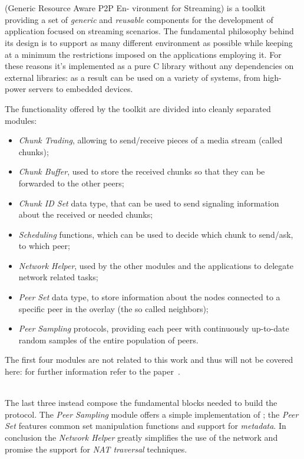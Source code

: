 \chapter{\grapes}
\grapes (Generic Resource Aware P2P En- vironment for Streaming) is a
toolkit providing a set of \textit{generic} and \textit{reusable}
components for the development of \ptop application focused on
streaming scenarios. The fundamental philosophy behind its design is
to support as many different environment as possible while keeping at
a minimum the restrictions imposed on the applications employing it.
For these reasons it's implemented as a pure C library without any dependencies
on external libraries: as a result \grapes can be used on a variety
of systems, from high-power servers to embedded devices.

The functionality offered by the toolkit are divided into cleanly
separated modules:
\begin{itemize}
  \item \textit{Chunk Trading}, allowing to send/receive pieces of a
    media stream (called chunks);
  \item \textit{Chunk Buffer}, used to store the received chunks so
    that they can be forwarded to the other peers;
  \item \textit{Chunk ID Set} data type, that can be used to send
    signaling information about the received or needed chunks;
   \item \textit{Scheduling} functions, which can be used to decide
     which chunk to send/ask, to which peer;
   \item \textit{Network Helper}, used by the other modules and the
     applications to delegate network related tasks;
   \item \textit{Peer Set} data type, to store information about the
     nodes connected to a specific peer in the overlay (the so called
     neighbors);
   \item \textit{Peer Sampling} protocols, providing each peer with
     continuously up-to-date random samples of the entire population
     of peers.
\end{itemize}

The first four modules are not related to this work and thus will not
be covered here: for further information refer to the
\grapes paper~\cite{GRAPES}.

\ \\
The last three instead compose the fundamental blocks needed to build
the \cloudcast \peersampling protocol. The \textit{Peer Sampling} module
offers a simple implementation of \cyclon; the \textit{Peer Set}
features common set manipulation functions and support for
\textit{metadata}. In conclusion the \textit{Network Helper} greatly
simplifies the use of the network and promise the support for
\textit{NAT traversal} techniques.

